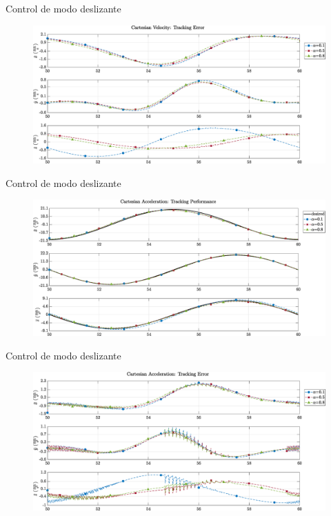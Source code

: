 \documentclass[10pt]{beamer} %
\begin{document}
	\begin{frame}[fragile]{Control de modo deslizante}
		\begin{figure}
			\centering
			\hspace*{-0.5cm}\includegraphics[width=1.1\textwidth]{img/SMCi/circular_traj/60_seg/articular_SMCi_vel_xyz_error_compare.eps}
		\end{figure}
	\end{frame}


	\begin{frame}[fragile]{Control de modo deslizante}
		\begin{figure}
			\centering
			\hspace*{-0.5cm}\includegraphics[width=1.1\textwidth]{img/SMCi/circular_traj/60_seg/articular_SMCi_accel_xyz_compare.eps}
		\end{figure}
	\end{frame}
	
	\begin{frame}[fragile]{Control de modo deslizante}
		\begin{figure}
			\centering
			\hspace*{-0.5cm}\includegraphics[width=1.1\textwidth]{img/SMCi/circular_traj/60_seg/articular_SMCi_accel_xyz_error_compare.eps}
		\end{figure}
	\end{frame}
\end{document}
